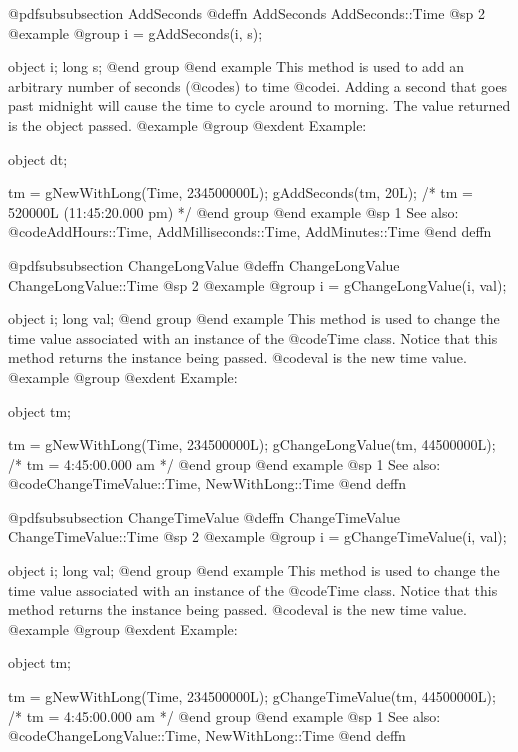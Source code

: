 @pdfsubsubsection {AddSeconds}
@deffn {AddSeconds} AddSeconds::Time
@sp 2
@example
@group
i = gAddSeconds(i, s);

object  i;
long    s;
@end group
@end example
This method is used to add an arbitrary number of seconds (@code{s}) to
time @code{i}.  Adding a second that goes past midnight will cause the time
to cycle around to morning.  The value returned is the object passed.
@example
@group
@exdent Example:

object  dt;

tm = gNewWithLong(Time, 234500000L);
gAddSeconds(tm, 20L);  /* tm = 520000L (11:45:20.000 pm) */
@end group
@end example
@sp 1
See also:  @code{AddHours::Time, AddMilliseconds::Time, AddMinutes::Time}
@end deffn










@pdfsubsubsection {ChangeLongValue}
@deffn {ChangeLongValue} ChangeLongValue::Time
@sp 2
@example
@group
i = gChangeLongValue(i, val);

object  i;
long    val;
@end group
@end example
This method is used to change the time value associated with an 
instance of the @code{Time} class.  Notice that this method
returns the instance being passed.  @code{val} is the new time value.
@example
@group
@exdent Example:

object  tm;

tm = gNewWithLong(Time, 234500000L);
gChangeLongValue(tm, 44500000L);   /*  tm = 4:45:00.000 am  */
@end group
@end example
@sp 1
See also:  @code{ChangeTimeValue::Time, NewWithLong::Time}
@end deffn










@pdfsubsubsection {ChangeTimeValue}
@deffn {ChangeTimeValue} ChangeTimeValue::Time
@sp 2
@example
@group
i = gChangeTimeValue(i, val);

object  i;
long    val;
@end group
@end example
This method is used to change the time value associated with an 
instance of the @code{Time} class.  Notice that this method
returns the instance being passed.  @code{val} is the new time value.
@example
@group
@exdent Example:

object  tm;

tm = gNewWithLong(Time, 234500000L);
gChangeTimeValue(tm, 44500000L);   /*  tm = 4:45:00.000 am  */
@end group
@end example
@sp 1
See also:  @code{ChangeLongValue::Time, NewWithLong::Time}
@end deffn











